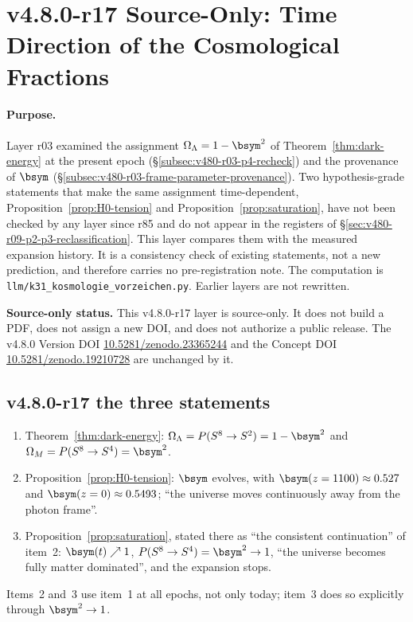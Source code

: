 \clearpage
\section*{v4.8.0-r17 Source-Only: Time Direction of the Cosmological Fractions}
\label{sec:v480-r17-cosmological-time-direction}

\paragraph{Purpose.}
Layer r03 examined the assignment \(\Omega_\Lambda=1-\bsym^2\) of Theorem~\ref{thm:dark-energy} at the present
epoch (\S\ref{subsec:v480-r03-p4-recheck}) and the provenance of \(\bsym\)
(\S\ref{subsec:v480-r03-frame-parameter-provenance}).  Two hypothesis-grade statements that make the same
assignment time-dependent, Proposition~\ref{prop:H0-tension} and Proposition~\ref{prop:saturation}, have not been
checked by any layer since r85 and do not appear in the registers of \S\ref{sec:v480-r09-p2-p3-reclassification}.
This layer compares them with the measured expansion history.  It is a consistency check of existing statements,
not a new prediction, and therefore carries no pre-registration note.  The computation is
\texttt{llm/k31\_kosmologie\_vorzeichen.py}.  Earlier layers are not rewritten.

\noindent\textbf{Source-only status.}
This v4.8.0-r17 layer is source-only.  It does not build a PDF, does not assign a new DOI,
and does not authorize a public release.  The v4.8.0 Version DOI
\href{https://doi.org/10.5281/zenodo.23365244}{10.5281/zenodo.23365244} and the Concept DOI
\href{https://doi.org/10.5281/zenodo.19210728}{10.5281/zenodo.19210728} are unchanged by it.

\subsection*{v4.8.0-r17 the three statements}
\label{subsec:v480-r17-statements}

\begin{enumerate}[leftmargin=2em]
\item Theorem~\ref{thm:dark-energy}: \(\Omega_\Lambda=P(S^8\to S^2)=1-\bsym^2\) and
\(\Omega_M=P(S^8\to S^4)=\bsym^2\).
\item Proposition~\ref{prop:H0-tension}: \(\bsym\) evolves, with \(\bsym(z=1100)\approx0.527\) and
\(\bsym(z=0)\approx0.5493\); ``the universe moves continuously away from the photon frame''.
\item Proposition~\ref{prop:saturation}, stated there as ``the consistent continuation'' of item~2:
\(\bsym(t)\nearrow1\), \(P(S^8\to S^4)=\bsym^2\to1\), ``the universe becomes fully matter dominated'', and the
expansion stops.
\end{enumerate}
Items~2 and~3 use item~1 at all epochs, not only today; item~3 does so explicitly through \(\bsym^2\to1\).

